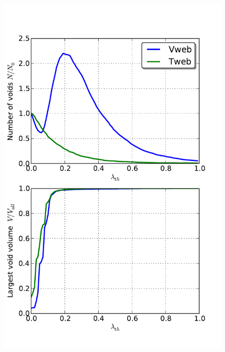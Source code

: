 \documentclass[usenatbib]{latex/mn2e}
\begin{document}
\begin{flushleft}
\begin{figure}
\begin{center}

  \includegraphics[trim = 1mm 10mm 8mm 18mm, clip, keepaspectratio=true,
  width=0.24\textheight]{./figures/voids_regions_percolation.pdf}

\end{center}
\end{figure}
\end{flushleft}
\end{document}
